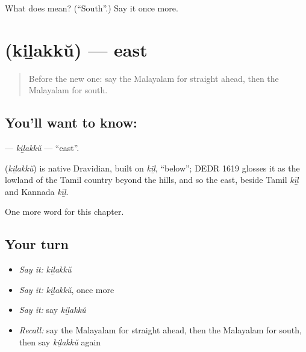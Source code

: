 \begin{tcolorbox}[breakable,colback=teal!4,colframe=teal!35!black,title={Before you move on}]
What does  mean? (\textquotedblleft{}South\textquotedblright{}.) Say it once more.
\end{tcolorbox}
\section[\texorpdfstring{\ml{കിഴക്ക്} (kiḻakkŭ)}{കിഴക്ക് (kiḻakkŭ)}]{ (kiḻakkŭ) — east}

\label{lesson:ML-C198-kilakku}



\begin{quote}
Before the new one: say the Malayalam for straight ahead, then the Malayalam for south.
\end{quote}

\subsection*{You'll want to know: }
\textbf{} — \emph{kiḻakkŭ} — \textquotedblleft{}east\textquotedblright{}.

\begin{cousinweb}
\textbf{} (\emph{kiḻakkŭ}) is native Dravidian, built on \emph{kīḻ}, \textquotedblleft{}below\textquotedblright{}; DEDR 1619 glosses it as the lowland of the Tamil country beyond the hills, and so the east, beside Tamil \emph{kīḻ} and Kannada \emph{kīḻ}.
\end{cousinweb}

\begin{grammarlens}[title={What you've built}]
One more word for this chapter.
\end{grammarlens}

\subsection*{Your turn}
\begin{itemize}
\raggedright
  \item \emph{Say it:} \emph{kiḻakkŭ}
  \item \emph{Say it:} \emph{kiḻakkŭ}, once more
  \item \emph{Say it:} say \emph{kiḻakkŭ}
  \item \emph{Recall:} say the Malayalam for straight ahead, then the Malayalam for south, then say \emph{kiḻakkŭ} again
\end{itemize}

